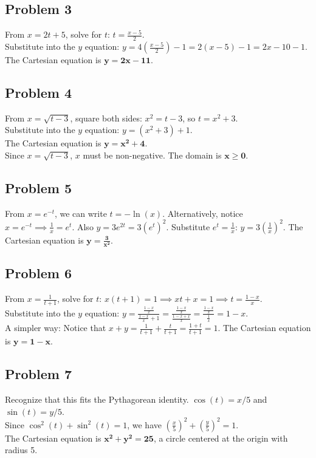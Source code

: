 \documentclass{article}
\begin{document}
\subsection*{Problem 3}
From $x = 2t + 5$, solve for $t$: $t = \frac{x-5}{2}$. \\
Substitute into the $y$ equation: $y = 4\left(\frac{x-5}{2}\right) - 1 = 2(x-5) - 1 = 2x - 10 - 1$. \\
The Cartesian equation is $\mathbf{y = 2x - 11}$.

\subsection*{Problem 4}
From $x = \sqrt{t-3}$, square both sides: $x^2 = t-3$, so $t = x^2+3$. \\
Substitute into the $y$ equation: $y = (x^2+3)+1$. \\
The Cartesian equation is $\mathbf{y = x^2+4}$. \\
Since $x = \sqrt{t-3}$, $x$ must be non-negative. The domain is $\mathbf{x \ge 0}$.

\subsection*{Problem 5}
From $x = e^{-t}$, we can write $t = -\ln(x)$.
Alternatively, notice $x = e^{-t} \implies \frac{1}{x} = e^t$.
Also $y = 3e^{2t} = 3(e^t)^2$.
Substitute $e^t = \frac{1}{x}$: $y = 3\left(\frac{1}{x}\right)^2$.
The Cartesian equation is $\mathbf{y = \frac{3}{x^2}}$.

\subsection*{Problem 6}
From $x = \frac{1}{t+1}$, solve for $t$: $x(t+1) = 1 \implies xt + x = 1 \implies t = \frac{1-x}{x}$. \\
Substitute into the $y$ equation: $y = \frac{\frac{1-x}{x}}{\frac{1-x}{x}+1} = \frac{\frac{1-x}{x}}{\frac{1-x+x}{x}} = \frac{\frac{1-x}{x}}{\frac{1}{x}} = 1-x$. \\
A simpler way: Notice that $x+y = \frac{1}{t+1} + \frac{t}{t+1} = \frac{1+t}{t+1} = 1$.
The Cartesian equation is $\mathbf{y = 1-x}$.

\subsection*{Problem 7}
Recognize that this fits the Pythagorean identity.
$\cos(t) = x/5$ and $\sin(t) = y/5$. \\
Since $\cos^2(t) + \sin^2(t) = 1$, we have $(\frac{x}{5})^2 + (\frac{y}{5})^2 = 1$. \\
The Cartesian equation is $\mathbf{x^2 + y^2 = 25}$, a circle centered at the origin with radius 5.
\end{document}
